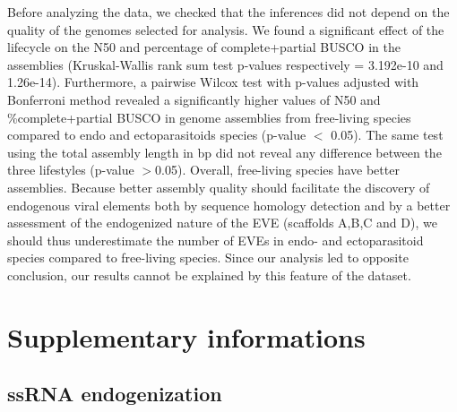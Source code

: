 Before analyzing the data, we checked that the inferences did not depend on the quality of the genomes selected for analysis. We found a significant effect of the lifecycle on the N50 and percentage of complete+partial BUSCO in the assemblies (Kruskal-Wallis rank sum test p-values respectively = 3.192e-10 and 1.26e-14). Furthermore, a pairwise Wilcox test with p-values adjusted with Bonferroni method revealed a significantly higher values of N50 and \%complete+partial BUSCO in genome assemblies from free-living species compared to endo and ectoparasitoids species (p-value $<$ 0.05). The same test using the total assembly length in bp did not reveal any difference between the three lifestyles (p-value $>$0.05). Overall, free-living species have better assemblies. Because better assembly quality should facilitate the discovery of endogenous viral elements both by sequence homology detection and by a better assessment of the endogenized nature of the EVE (scaffolds A,B,C and D), we should thus underestimate the number of EVEs in endo- and ectoparasitoid species compared to free-living species. Since our analysis led to opposite conclusion, our results cannot be explained by this feature of the dataset.

\section{Supplementary informations}

\subsection{ssRNA endogenization}
\label{sec:SI-1}

